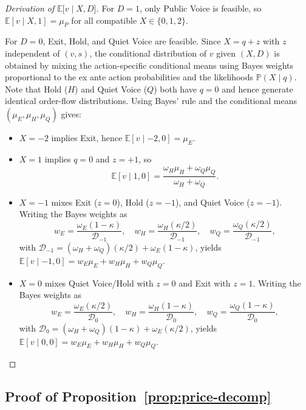 \documentclass[11pt]{article}
\newcommand{\E}{\mathbb{E}}
\newcommand{\PP}{\mathbb{P}}
\newcommand{\1}{\mathbf{1}}
\begin{document}
\begin{proof}[Derivation of $\E\lbrack v \mid X,D\rbrack$]
For $D=1$, only Public Voice is feasible, so $\E[v \mid X,1]=\mu_P$ for all compatible $X\in\{0,1,2\}$.

For $D=0$, Exit, Hold, and Quiet Voice are feasible. Since $X=q+z$ with $z$ independent of $(v,s)$, the conditional distribution of $v$ given $(X,D)$ is obtained by mixing the action-specific conditional means using Bayes weights proportional to the ex ante action probabilities and the likelihoods $\PP(X \mid q)$. Note that Hold ($H$) and Quiet Voice ($Q$) both have $q=0$ and hence generate identical order-flow distributions. Using Bayes' rule and the conditional means $(\mu_E,\mu_H,\mu_Q)$ gives:
\begin{itemize}[leftmargin=1.5em,itemsep=0pt]
\item $X=-2$ implies Exit, hence $\E[v \mid -2,0]=\mu_E$.
\item $X=1$ implies $q=0$ and $z=+1$, so
\[
\E[v \mid 1,0] = \frac{\omega_H \mu_H + \omega_Q \mu_Q}{\omega_H + \omega_Q}.
\]
\item $X=-1$ mixes Exit ($z=0$), Hold ($z=-1$), and Quiet Voice ($z=-1$). Writing the Bayes weights as
\[
w_E=\frac{\omega_E(1-\kappa)}{\mathcal{D}_{-1}},\quad
w_H=\frac{\omega_H(\kappa/2)}{\mathcal{D}_{-1}},\quad
w_Q=\frac{\omega_Q(\kappa/2)}{\mathcal{D}_{-1}},
\]
with $\mathcal{D}_{-1}=(\omega_H+\omega_Q)(\kappa/2)+\omega_E(1-\kappa)$, yields $\E[v \mid -1,0]=w_E\mu_E+w_H\mu_H+w_Q\mu_Q$.
\item $X=0$ mixes Quiet Voice/Hold with $z=0$ and Exit with $z=1$. Writing the Bayes weights as
\[
w_E=\frac{\omega_E(\kappa/2)}{\mathcal{D}_0},\quad
w_H=\frac{\omega_H(1-\kappa)}{\mathcal{D}_0},\quad
w_Q=\frac{\omega_Q(1-\kappa)}{\mathcal{D}_0},
\]
with $\mathcal{D}_0=(\omega_H+\omega_Q)(1-\kappa)+\omega_E(\kappa/2)$, yields $\E[v \mid 0,0]=w_E\mu_E+w_H\mu_H+w_Q\mu_Q$.
\end{itemize}
\end{proof}

\subsection{Proof of Proposition~\ref{prop:price-decomp}}
\label{app:proof-price-decomp}
\end{document}
